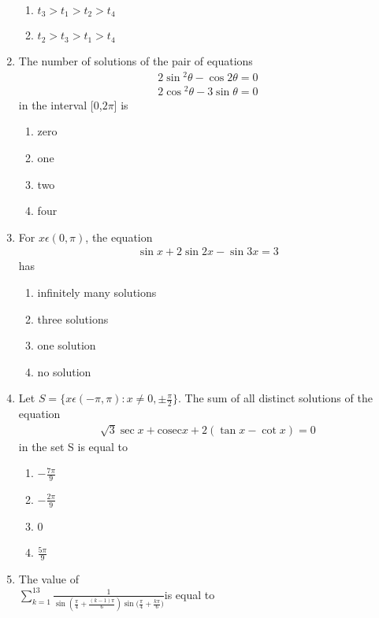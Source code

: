 \begin{enumerate}[label=\arabic*.,ref=\thesubsection.\theenumi]
\begin{enumerate}
       \item $t_3> t_1> t_2 > t_4$
       \item $t_2> t_3> t_1 > t_4$
   \end{enumerate}
   \item The number of solutions of the pair of equations 
   \begin{align}
       2\sin{^2\theta} - \cos{2\theta} = 0\\
       2\cos{^2\theta} - 3\sin{\theta} = 0
   \end{align}
   in the interval [0,$2\pi$] is
   \begin{enumerate}
       \item zero
       \item one
       \item two
       \item four
   \end{enumerate}
   \item For $x\epsilon (0 ,\pi)$, the equation 
   \begin{align}
       \sin{x} + 2\sin{2x}-\sin{3x} =3
   \end{align} has
   \begin{enumerate}
       \item infinitely many solutions
       \item three solutions
       \item one solution
       \item no solution
   \end{enumerate}
   \item Let $S = \{x\epsilon(-\pi , \pi) : x \neq 0, \pm{\frac{\pi}{2}}\}$. The sum of all distinct solutions of the  equation 
   \begin{align}
       \sqrt3\sec{x} + \mathrm{cosec}{x} +2(\tan{x}- \cot{x}) =0  
   \end{align}
   in the set S is equal to
   \begin{enumerate}
       \item $-\frac{7\pi}{9}$
       \item $-\frac{2\pi}{9}$
       \item 0
       \item $\frac{5\pi}{9}$
   \end{enumerate}
   \item The value of\\ $\sum_{k=1}^{13}\frac{1}{\sin{(\frac{\pi}{4}+\frac{(k-1)\pi}{6})}\sin{(\frac{\pi}{4}+\frac{k\pi}{6}})}$is equal to
   \begin{enumerate}

\end{enumerate}
\end{enumerate}
